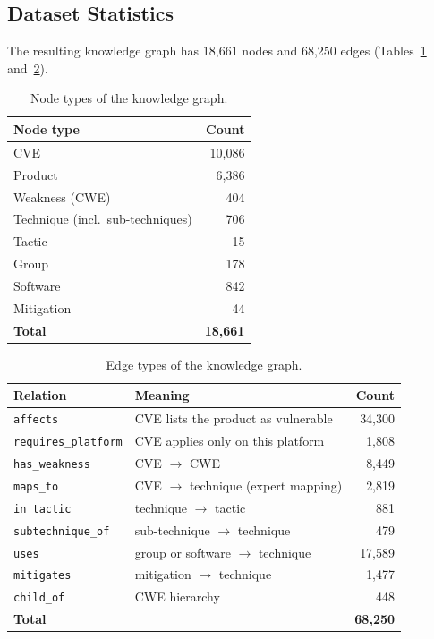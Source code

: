 \documentclass[12pt, a4paper]{article}
\begin{document}
\subsection{Dataset Statistics}
The resulting knowledge graph has 18,661 nodes and 68,250 edges (Tables~\ref{tab:nodes} and~\ref{tab:edges}).
\begin{table}[H]\centering\caption{Node types of the knowledge graph.}\label{tab:nodes}
\begin{tabular}{lr}\toprule \textbf{Node type} & \textbf{Count} \\ \midrule
CVE & 10,086 \\ Product & 6,386 \\ Weakness (CWE) & 404 \\ Technique (incl.\ sub-techniques) & 706 \\ Tactic & 15 \\ Group & 178 \\ Software & 842 \\ Mitigation & 44 \\ \midrule \textbf{Total} & \textbf{18,661} \\ \bottomrule\end{tabular}
\end{table}
\begin{table}[H]\centering\caption{Edge types of the knowledge graph.}\label{tab:edges}
\begin{tabular}{llr}\toprule \textbf{Relation} & \textbf{Meaning} & \textbf{Count} \\ \midrule
\texttt{affects} & CVE lists the product as vulnerable & 34,300 \\ \texttt{requires\_platform} & CVE applies only on this platform & 1,808 \\ \texttt{has\_weakness} & CVE $\rightarrow$ CWE & 8,449 \\
\texttt{maps\_to} & CVE $\rightarrow$ technique (expert mapping) & 2,819 \\ \texttt{in\_tactic} & technique $\rightarrow$ tactic & 881 \\ \texttt{subtechnique\_of} & sub-technique $\rightarrow$ technique & 479 \\
\texttt{uses} & group or software $\rightarrow$ technique & 17,589 \\ \texttt{mitigates} & mitigation $\rightarrow$ technique & 1,477 \\ \texttt{child\_of} & CWE hierarchy & 448 \\ \midrule \textbf{Total} & & \textbf{68,250} \\ \bottomrule\end{tabular}
\end{table}
\end{document}
